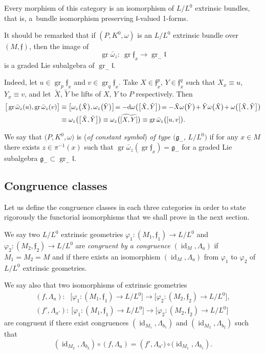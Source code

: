 \documentclass[10pt,a4paper]{amsart}
\newcommand{\f}{\mathfrak f}
\newcommand{\g}{\mathfrak g}
\newcommand{\lf}{\mathfrak l}
\newcommand{\om}{\omega}
\newcommand{\id}{\operatorname{id}}
\newcommand{\gr}{\operatorname{gr}}
\numberwithin{equation}{section}
\begin{document}
Every morphism of this category is an isomorphism of $L/L^0$ extrinsic bundles, that is, a~bundle isomorphism preserving $\lf$-valued 1-forms.


It should be remarked that if $(P,K^0,\om)$ is an $L/L^0$ extrinsic bundle over $(M,\f)$, then the image of
\[
\gr \bar\om_z \colon\ \gr \f_x \to \gr_{-}\lf
\]
is a graded Lie subalgebra of $\gr_{-} \lf$.

Indeed, let $u\in \gr_p\f_x$ and $v\in \gr_q\f_x$. Take $X\in \f^p_x$, $Y\in \f^q_x$ such that $X_x\equiv u$, $Y_x\equiv v$, and let~$\tilde X$, $\tilde Y$ be lifts of $X$, $Y$ to $P$ respectively. Then
\begin{align*}
\big[\gr \bar\om_z(u), \gr \bar\om_z(v)\big] &\equiv \big[\om_z\big(\tilde X\big), \om_z\big(\tilde Y\big)\big]
\!= -{\rm d}\om\big(\big[\tilde X, \tilde Y\big]\big) \!= -\tilde X \om\big(\tilde Y\big) \!+\tilde Y \om \big(\tilde X\big)
\!+\om\big(\big[\tilde X,\tilde Y\big]\big)
\\
&\equiv \om_z\big(\big[\tilde X,\tilde Y\big]\big) \equiv \om_z\big(\widetilde{[X,Y]}\big) \equiv \gr \bar\om_z\big([u,v]\big).
\end{align*}


We say that $\big(P,K^0,\om\big)$ is (\emph{of constant symbol}) \emph{of type
	$\big(\g_-, \, L/L^0\big)$} if for any $x\in M$ there exists $z\in\pi^{-1}(x)$ such that $\gr\bar\om_z (\gr\f_x)=\g_{-}$ for a graded Lie subalgebra $\g_{-}\subset \gr_{-}\lf$.


\subsection{Congruence classes}

Let us define the congruence classes in each three categories in order to state rigorously the functorial isomorphisms that we shall prove in the next section.

We say two $L/L^0$ extrinsic geometries $\varphi_1\colon (M_1, \f_1)\to L/L^0$ and $\varphi_2 \colon (M_2, \f_2)\to L/L^0 $
are \emph{congruent by a congruence} $\left(\id_M, \Lambda_a\right)$
if $M_1 = M_2 = M$ and if there exists an isomorphism $\left(\id_M, \Lambda_a\right)$
from $\varphi_1$ to $\varphi_2$ of $L/L^0$ extrinsic geometries.

We say also that two isomorphisms of extrinsic geometries
\begin{gather*}
	(f, \Lambda_a)\colon\ \ \,\big[\varphi_1\colon (M_1, \f_1)\to L/L^0 \big]	\to
	\big[\varphi_2 \colon (M_2, \f_2)\to L/L^0 \big],
\\
	(f', \Lambda_{a'})\colon\ \big[\varphi_1\colon (M_1, \f_1)\to L/L^0 \big]	\to
	\big[\varphi_2 \colon (M_2, \f_2)\to L/L^0 \big]
\end{gather*}
are congruent if there exist congruences
$\left(\id_{M_1}, \Lambda_{b_1}\right)$ and $\left(\id_{M_2}, \Lambda_{b_2}\right)$
such that
\[
 \left(\id_{M_2}, \Lambda_{b_2}\right) \circ (f, \Lambda_a) = \left(f', \Lambda_{a'})\circ (\id_{M_1}, \Lambda_{b_1}\right)\!.
\]
\end{document}

